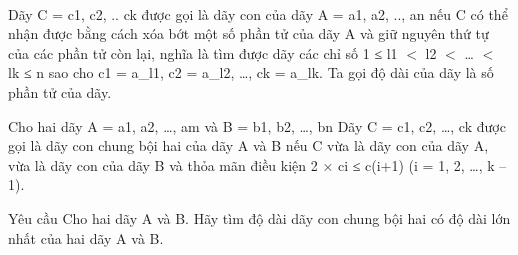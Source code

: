  

Dãy C = c1, c2, .. ck được gọi là dãy con của dãy A = a1, a2, .., an nếu C có thể nhận được bằng cách xóa bớt một số phần tử của dãy A và giữ nguyên thứ tự của các phần tử còn lại, nghĩa là tìm được dãy các chỉ số 1 ≤ l1 $<$ l2 $<$ … $<$ lk ≤ n sao cho c1 = a\_l1, c2 = a\_l2, …, ck = a\_lk. Ta gọi độ dài của dãy là số phần tử của dãy.

Cho hai dãy A = a1, a2, …, am và B = b1, b2, …, bn Dãy C = c1, c2, …, ck được gọi là dãy con chung bội hai của dãy A và B nếu C vừa là dãy con của dãy A, vừa là dãy con của dãy B và thỏa mãn điều kiện 2 × ci ≤ c(i+1) (i = 1, 2, …, k – 1).

Yêu cầu
Cho hai dãy A và B. Hãy tìm độ dài dãy con chung bội hai có độ dài lớn nhất của hai dãy A và B.
